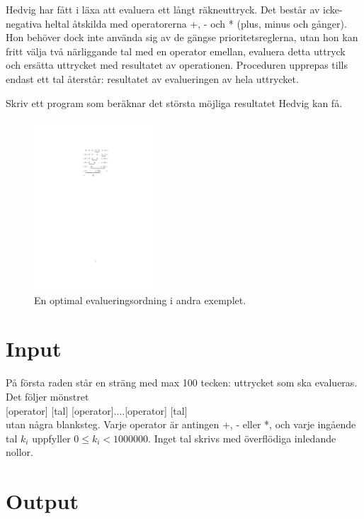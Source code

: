
Hedvig har fått i läxa att evaluera ett långt räkneuttryck. Det består av icke-negativa heltal åtskilda med operatorerna +, - och * (plus, minus och gånger). Hon behöver dock inte använda sig av de gängse prioritetsreglerna, utan hon kan fritt välja två närliggande tal med en operator emellan, evaluera detta uttryck och ersätta uttrycket med resultatet av operationen. Proceduren upprepas tills endast ett tal återstår: resultatet av evalueringen av hela uttrycket.

Skriv ett program som beräknar det största möjliga resultatet Hedvig kan få.

\begin{figure}[ht!]
\centering
\includegraphics[width=0.4\textwidth]{example.pdf}
\caption{En optimal evalueringsordning i andra exemplet.}
\label{overflow}
\end{figure}

\section*{Input}

På första raden står en sträng med max 100 tecken: uttrycket som ska evalueras. Det följer mönstret\\
[tal] [operator] [tal] [operator]....[operator] [tal] \\
utan några blanksteg. Varje operator är antingen +, - eller *, och varje ingående tal $k_i$ uppfyller $0\leq k_i < 1000000$. Inget tal skrivs med överflödiga inledande nollor.

\section*{Output}

